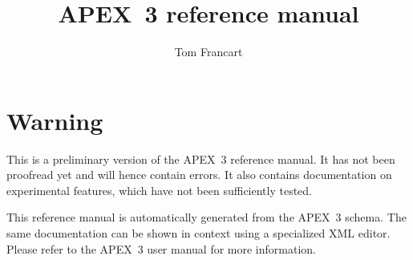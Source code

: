 \documentclass[a4paper,12pt]{article}
\title{APEX~3 reference manual}
\author{Tom Francart}
\begin{document}
\maketitle

\newpage


\section*{Warning}

This is a preliminary version of the APEX~3 reference manual. It has not been proofread 
yet and will hence contain errors. It also contains documentation on experimental 
features, which have not been sufficiently tested. 

This reference manual is automatically generated from the APEX~3 schema. The same
documentation can be shown in context using a specialized XML editor. Please
refer to the APEX~3 user manual for more information.
 

\newpage

\tableofcontents



\end{document}
